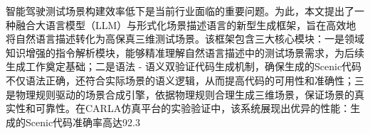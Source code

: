 \begin{abstractzh}
	
	智能驾驶测试场景构建效率低下是当前行业面临的重要问题。为此，本文提出了一种融合大语言模型（LLM）与形式化场景描述语言的新型生成框架，旨在高效地将自然语言描述转化为高保真三维测试场景。该框架包含三大核心模块：一是领域知识增强的指令解析模块，能够精准理解自然语言描述中的测试场景需求，为后续生成工作奠定基础；二是语法 - 语义双验证代码生成机制，确保生成的Scenic代码不仅语法正确，还符合实际场景的语义逻辑，从而提高代码的可用性和准确性；三是物理规则驱动的场景合成引擎，依据物理规则合理生成三维场景，保证场景的真实性和可靠性。在CARLA仿真平台的实验验证中，该系统展现出优异的性能：生成的Scenic代码准确率高达92.3%
	
\end{abstractzh}